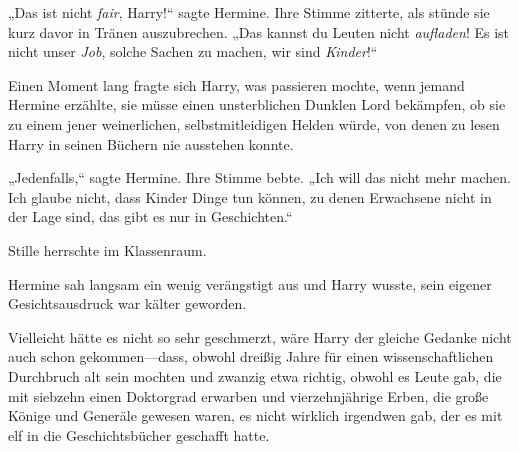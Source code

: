„Das ist nicht \emph{fair}, Harry!“ sagte Hermine. Ihre Stimme zitterte, als stünde sie kurz davor in Tränen auszubrechen. „Das kannst du Leuten nicht \emph{aufladen}! Es ist nicht unser \emph{Job}, solche Sachen zu machen, wir sind \emph{Kinder}!“

Einen Moment lang fragte sich Harry, was passieren mochte, wenn jemand Hermine erzählte, sie müsse einen unsterblichen Dunklen Lord bekämpfen, ob sie zu einem jener weinerlichen, selbstmitleidigen Helden würde, von denen zu lesen Harry in seinen Büchern nie ausstehen konnte.

„Jedenfalls,“ sagte Hermine. Ihre Stimme bebte. „Ich will das nicht mehr machen. Ich glaube nicht, dass Kinder Dinge tun können, zu denen Erwachsene nicht in der Lage sind, das gibt es nur in Geschichten.“

Stille herrschte im Klassenraum.

Hermine sah langsam ein wenig verängstigt aus und Harry wusste, sein eigener Gesichtsausdruck war kälter geworden.

Vielleicht hätte es nicht so sehr geschmerzt, wäre Harry der gleiche Gedanke nicht auch schon gekommen—dass, obwohl dreißig Jahre für einen wissenschaftlichen Durchbruch alt sein mochten und zwanzig etwa richtig, obwohl es Leute gab, die mit siebzehn einen Doktorgrad erwarben und vierzehnjährige Erben, die große Könige und Generäle gewesen waren, es nicht wirklich irgendwen gab, der es mit elf in die Geschichtsbücher geschafft hatte.

